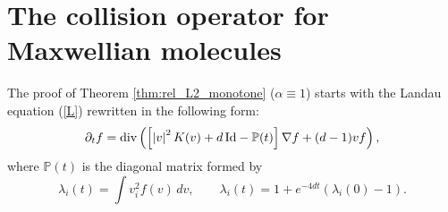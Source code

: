 \documentclass[11pt]{amsart}
\numberwithin{equation}{section}
\begin{document}
\section{The collision operator for Maxwellian molecules}\label{sec:collision_operator_MM}


The proof of Theorem \ref{thm:rel_L2_monotone} ($\alpha \equiv 1$) starts with the Landau equation (\ref{L})  rewritten in the following form:
% 
\begin{equation}\label{eq:Landau_MM_linear}
  \partial_t f = \textnormal{div}\left( 
      \left[ \left\vert v \right\vert ^{2}K(v) + d\, \textnormal{Id}  - \mathbb{P}(t) \right]\nabla f
      + (d-1)vf
     \right),
\end{equation}
% 
where $\mathbb P(t)$ is the diagonal matrix formed by
% 
\begin{equation}\label{eq:lambda_i}
  \lambda_i(t) = \int v_i^2f(v)\,dv,\qquad \lambda_i(t) = 1 + e^{-4dt}(\lambda_i(0)-1).
\end{equation}
% 

% 
\end{document}
